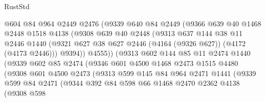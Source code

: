 \begin{lexlean}{RustStd}
\begin{coremodule}
                      @604
                      @84
                      @964
                      @2449
                      @2476
                      (@9339
                        @640
                        @84
                        @2449
                        (@9366
                          @639
                          @40
                          @1468
                          @2448
                          @1518
                          @4138
                          (@9308
                            @639
                            @40
                            @2448
                            (@9313
                              @637
                              @144
                              @38
                              @11
                              @2446
                              @1440
                              (@9321 @627 @38 @627 @2446 (@4164 (@9326 @627)) (@4172 (@4173 @2446)))
                              @9394))
                          @4555))
                      (@9313
                        @602
                        @144
                        @85
                        @11
                        @2474
                        @1440
                        (@9339
                          @602
                          @85
                          @2474
                          (@9346
                            @601
                            @4500
                            @1468
                            @2473
                            @1515
                            @4480
                            (@9308
                              @601
                              @4500
                              @2473
                              (@9313
                                @599
                                @145
                                @84
                                @964
                                @2471
                                @1441
                                (@9339
                                  @599
                                  @84
                                  @2471
                                  (@9344
                                    @392
                                    @84
                                    @598
                                    @66
                                    @1468
                                    @2470
                                    @2362
                                    @4138
                                    (@9308
                                      @598

\end{coremodule}
\end{lexlean}
